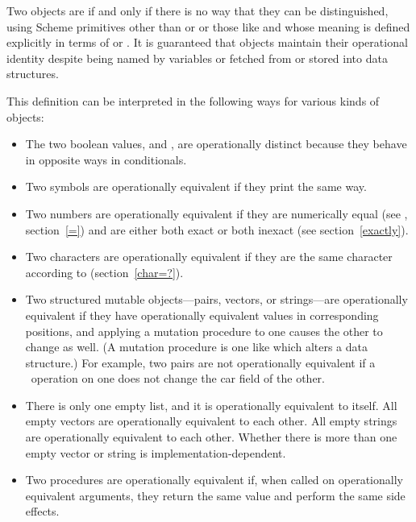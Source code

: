 \vest Two objects are  if and only if
there is no way that they can be distinguished, using Scheme primitives
other than  or  or those like  and
 whose meaning is defined explicitly in terms of  or
.  It is guaranteed that objects maintain their operational
identity despite being named by variables or fetched from or stored into
data structures.

\vest This definition can be interpreted in the following ways for various
kinds of objects:

\begin{itemize}
\item The two boolean values, \schtrue{} and
\schfalse{}, are operationally distinct because they behave in
opposite ways in conditionals.

\item Two symbols are operationally equivalent if they print
the same way.

\item Two numbers are operationally equivalent if they are numerically
equal (see \ide{=}, section~\ref{=}) and are either both exact or both
inexact (see section~\ref{exactly}).

\item Two characters are operationally equivalent if they are the same
character according to  (section~\ref{char=?}).

\item Two structured mutable objects---pairs, vectors, or strings---are
operationally equivalent if they have operationally equivalent values in
corresponding positions, and applying a mutation procedure to one causes
the other to change as well.  (A mutation procedure is one like
 which alters a data structure.) For example, two pairs are not operationally equivalent if a
\ operation on one does not change the car field of the
other.

\item There is only one empty list, and it is
operationally equivalent to itself.  All empty vectors are operationally
equivalent to each other.  All empty strings are operationally
equivalent to each other.  Whether there is more than one empty vector
or string is implementation-dependent.

\item Two procedures are operationally equivalent if, when called on
operationally equivalent arguments, they return the same value and
perform the same side effects.

\end{itemize}


